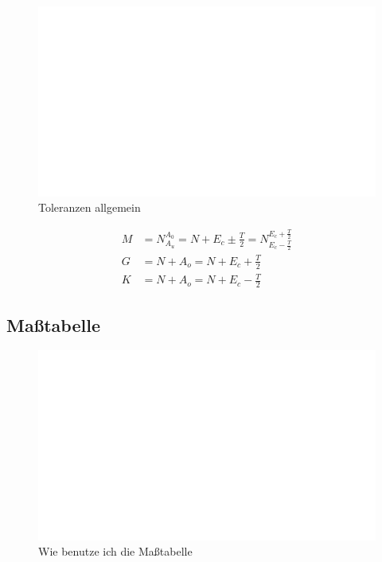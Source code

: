 \begin{figure}[h]
	\centering
	\includegraphics[scale=0.9]{leer.png}
	\caption{Toleranzen allgemein}
\end{figure}

\begin{align*}
M &= N^{A_0}_{A_u} = N + E_c \pm \frac{T}{2} = N^{E_c + \frac{T}{2}}_{E_c - \frac{T}{2}} \\
G &= N + A_o = N + E_c + \frac{T}{2} \\
K &= N + A_o = N + E_c - \frac{T}{2}
\end{align*}

\newpage

\subsection*{Maßtabelle}

\begin{figure}[h]
	\centering
	\includegraphics[scale=0.9]{leer.png}
	\caption{Wie benutze ich die Maßtabelle}
\end{figure}


